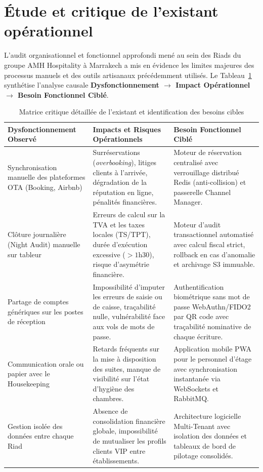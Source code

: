 \documentclass[12pt,a4paper,oneside]{report}
\begin{document}
\section{Étude et critique de l'existant opérationnel}

L'audit organisationnel et fonctionnel approfondi mené au sein des Riads du groupe AMH Hospitality à Marrakech a mis en évidence les limites majeures des processus manuels et des outils artisanaux précédemment utilisés. Le Tableau~\ref{tab:critique_existant_detail} synthétise l'analyse causale \textbf{Dysfonctionnement $\rightarrow$ Impact Opérationnel $\rightarrow$ Besoin Fonctionnel Ciblé}.

\begin{table}[H]
\centering
\small
\renewcommand{\arraystretch}{1.3}
\begin{tabularx}{\textwidth}{|p{3.8cm}|p{4.2cm}|X|}
\hline
\textbf{Dysfonctionnement Observé} & \textbf{Impacts et Risques Opérationnels} & \textbf{Besoin Fonctionnel Ciblé} \\
\hline
Synchronisation manuelle des plateformes OTA (Booking, Airbnb) & Surréservations (\textit{overbooking}), litiges clients à l'arrivée, dégradation de la réputation en ligne, pénalités financières. & Moteur de réservation centralisé avec verrouillage distribué Redis (anti-collision) et passerelle Channel Manager. \\
\hline
Clôture journalière (Night Audit) manuelle sur tableur & Erreurs de calcul sur la TVA et les taxes locales (TS/TPT), durée d'exécution excessive ($> 1$h30), risque d'asymétrie financière. & Moteur d'audit transactionnel automatisé avec calcul fiscal strict, rollback en cas d'anomalie et archivage S3 immuable. \\
\hline
Partage de comptes génériques sur les postes de réception & Impossibilité d'imputer les erreurs de saisie ou de caisse, traçabilité nulle, vulnérabilité face aux vols de mots de passe. & Authentification biométrique sans mot de passe WebAuthn/FIDO2 par QR code avec traçabilité nominative de chaque écriture. \\
\hline
Communication orale ou papier avec le Housekeeping & Retards fréquents sur la mise à disposition des suites, manque de visibilité sur l'état d'hygiène des chambres. & Application mobile PWA pour le personnel d'étage avec synchronisation instantanée via WebSockets et RabbitMQ. \\
\hline
Gestion isolée des données entre chaque Riad & Absence de consolidation financière globale, impossibilité de mutualiser les profils clients VIP entre établissements. & Architecture logicielle Multi-Tenant avec isolation des données et tableaux de bord de pilotage consolidés. \\
\hline
\end{tabularx}
\caption{Matrice critique détaillée de l'existant et identification des besoins cibles}
\label{tab:critique_existant_detail}
\end{table}
\end{document}
